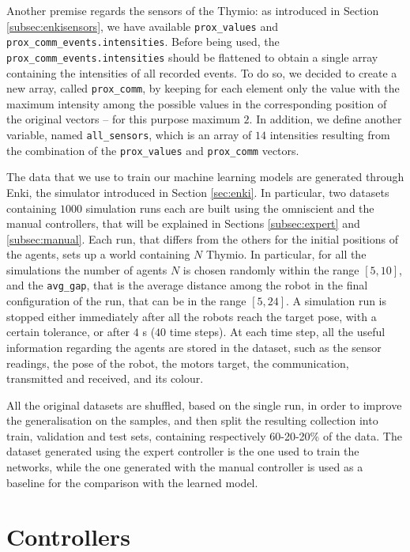 Another premise regards the sensors of the Thymio: as introduced in Section 
\ref{subsec:enkisensors}, we have available \texttt{prox\_values} and 
\texttt{prox\_comm\_events.intensities}. Before being used, the 
\texttt{prox\_comm\_events.intensities} should be flattened to obtain a single 
array containing the intensities of all recorded events. 
To do so, we decided to create a new array, called \texttt{prox\_comm}, by 
keeping for each element only the value with the maximum intensity among the 
possible values in the corresponding position of the original vectors – for this 
purpose maximum $2$.
In addition, we define another variable, named \texttt{all\_sensors}, which is an 
array of $14$ intensities resulting from the combination of the 
\texttt{prox\_values} and \texttt{prox\_comm} vectors.

The data that we use to train our machine learning models are generated through 
Enki, the simulator introduced in Section \ref{sec:enki}.
In particular, two datasets containing $1000$ simulation runs each are built using 
the omniscient and the manual controllers, that will be explained in Sections 
\ref{subsec:expert} and \ref{subsec:manual}. 
Each run, that differs from the others for the initial positions of the agents, sets up 
a world containing $N$ Thymio. 
In particular, for all the simulations the number of agents $N$ is chosen randomly 
within the range $[5, 10]$, and the \texttt{avg\_gap}, that is the average distance 
among the robot in the final configuration of the run, that can be in the range 
$[5, 24]$.
A simulation run is stopped either immediately after all the robots reach the 
target pose, with a certain tolerance, or after $4$ \gls{s} ($40$ time steps).
At each time step, all the useful information regarding the agents are stored in the 
dataset, such as the sensor readings, the pose of the robot, the motors target, the 
communication, transmitted and received, and its colour.

All the original datasets are shuffled, based on the single run, in order to improve 
the generalisation on the samples, and then split the resulting collection into 
train, validation and test sets, containing respectively 60-20-20\% of the data.
The dataset generated using the expert controller is the one used to train the 
networks, while the one generated with the manual controller is used as a 
baseline for the comparison with the learned model.

\section{Controllers}
\label{sec:controllersmodel}

